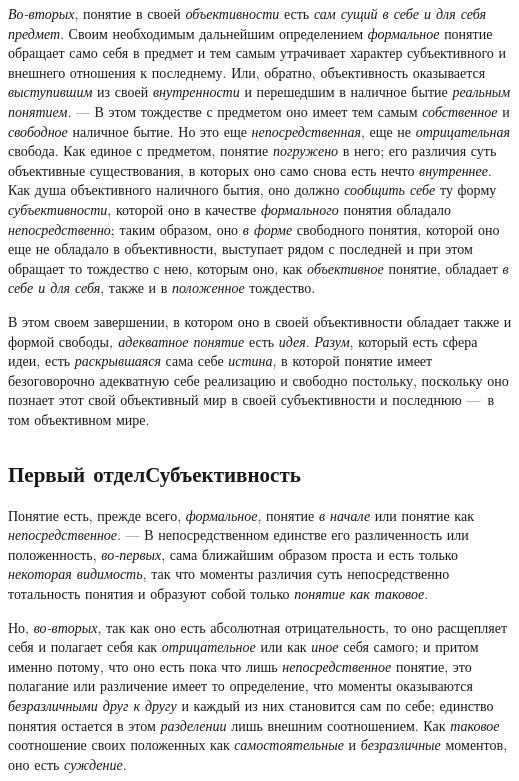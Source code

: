 \documentclass[twoside]{article}
\begin{document}
{{{{\em Во-вторых}, понятие в
своей {\em объективности}
есть {\em сам сущий в себе
и для себя предмет}. Своим необходимым дальнейшим
определением {\em формальное}
понятие обращает само себя в предмет и тем самым утрачивает
характер субъективного и внешнего отношения к последнему. Или, обратно,
объективность оказывается
{\em выступившим} из
своей {\em внутренности}
и перешедшим в наличное бытие
{\em реальным понятием}. —
В этом тождестве с предметом оно имеет тем самым
{\em собственное} и
{\em свободное} наличное
бытие. Но это еще
{\em непосредственная},
еще не
{\em отрицательная}
свобода. Как единое с предметом, понятие
{\em погружено} в него;
его различия суть объективные существования, в которых оно само снова есть
нечто {\em внутреннее}.
Как душа объективного наличного бытия, оно должно
{\em сообщить себе} ту
форму {\em субъективности},
которой оно в качестве
{\em формального} понятия
обладало {\em непосредственно};
таким образом, оно {\em в
форме} свободного понятия, которой оно еще не обладало в
объективности, выступает рядом с последней и при этом обращает то тождество
с нею, которым оно, как
{\em объективное}
понятие, обладает {\em в
себе и для себя}, также и в
{\em положенное}
тождество.

В этом своем завершении, в котором оно в своей объективности
обладает также и формой свободы{\em ,
адекватное понятие} есть
{\em идея}.
{\em Разум}, который есть
сфера идеи, есть {\em раскрывшаяся}
сама себе {\em истина},
в которой понятие имеет безоговорочно адекватную себе
реализацию и свободно постольку, поскольку оно познает этот свой
объективный мир в своей субъективности и последнюю —~в том
объективном мире.

\clearpage\subsection[Первый отдел Субъективность]{Первый отдел\newline Субъективность}
Понятие есть, прежде всего,
{\em формальное}, понятие
{\em в начале} или
понятие как {\em непосредственное}. —
В непосредственном единстве его различенность или
положенность, {\em во-первых},
сама ближайшим образом проста и есть только
{\em некоторая видимость},
так что моменты различия суть непосредственно тотальность
понятия и образуют собой только
{\em понятие как таковое}.

Но, {\em во-вторых},
так как оно есть абсолютная отрицательность, то оно
расщепляет себя и полагает себя как
{\em отрицательное} или
как {\em иное} себя
самого; и притом именно потому, что оно есть пока что лишь
{\em непосредственное}
понятие, это полагание или различение имеет то определение,
что моменты оказываются
{\em безразличными друг к другу}
и каждый из них становится сам по себе; единство понятия
остается в этом {\em разделении}
лишь внешним соотношением. Как
{\em таковое} соотношение
своих положенных как
{\em самостоятельные} и
{\em безразличные}
моментов, оно есть
{\em суждение}.

}}}
\end{document}
